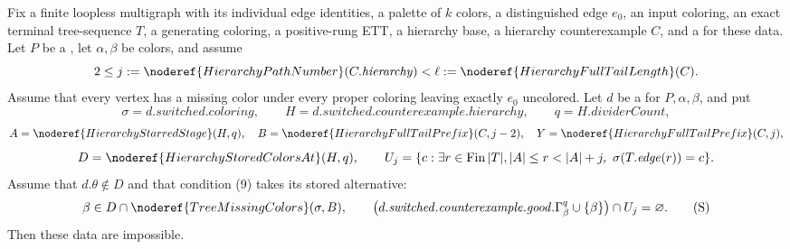 \begin{lemma}
Fix a finite loopless multigraph with its individual edge identities, a
palette of $k$ colors, a distinguished edge $e_0$, an input coloring,
an exact terminal tree-sequence $T$, a generating coloring, a
positive-rung ETT, a hierarchy base, a hierarchy counterexample $C$, and
a  for these data.  Let
$P$ be a , let
$\alpha,\beta$ be colors, and assume
\[
 2\le j:=\noderef{HierarchyPathNumber}(C.\mathit{hierarchy})
   <\ell:=\noderef{HierarchyFullTailLength}(C).
\]
Assume that every vertex has a missing color under every proper coloring
leaving exactly $e_0$ uncolored.  Let $d$ be a
 for
$P,\alpha,\beta$, and put
\[
 \sigma=d.\mathit{switched.coloring},\qquad
 H=d.\mathit{switched.counterexample.hierarchy},\qquad
 q=H.\mathit{dividerCount},
\]
\[
 A=\noderef{HierarchyStarredStage}(H,q),\quad
 B=\noderef{HierarchyFullTailPrefix}(C,j-2),\quad
 Y=\noderef{HierarchyFullTailPrefix}(C,j),
\]
\[
 D=\noderef{HierarchyStoredColorsAt}(H,q),\qquad
 U_j=\{c:\exists r\in\operatorname{Fin}|T|,
 |A|\le r<|A|+j,\ \sigma(T.\mathit{edge}(r))=c\}.
\]
Assume that $d.\theta\notin D$ and that condition (9) takes its stored
alternative:
\[
 \beta\in D\cap\noderef{TreeMissingColors}(\sigma,B),\qquad
 \bigl(d.\mathit{switched.counterexample.good}.\Gamma^q_\beta
        \cup\{\beta\}\bigr)\cap U_j=\varnothing.              \tag{S}
\]
Then these data are impossible.
\end{lemma}
